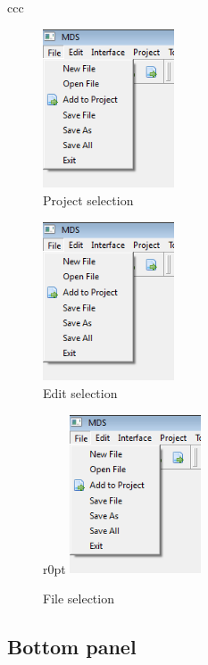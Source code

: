     \begin{tabular}[h!]
        \begin{table}{ccc}
            \begin{figure}
                \includegraphics[width=110pt]{img/menu_file.png}
                \caption{Project selection}
            \end{figure}

            \begin{figure}
                \includegraphics[width=110pt]{img/menu_file.png}
                \caption{Edit selection}
            \end{figure}

            \begin{figure}{r}{0pt}
                \includegraphics[width=110pt]{img/menu_file.png}
                \caption{File selection}
            \end{figure}
        \end{table}
    \end{tabular}

\subsection{Bottom panel}

